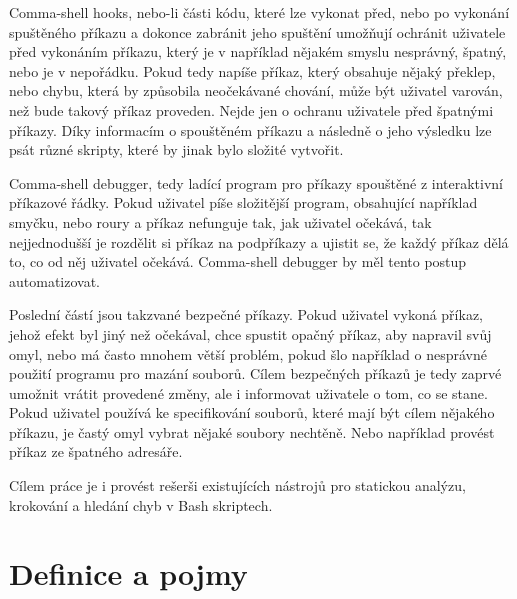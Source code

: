 \documentclass[thesis=M,czech]{FITthesis}[2012/06/26]
\begin{document}
\begin{introduction}
Comma-shell hooks, nebo-li části kódu, které lze vykonat před, nebo po vykonání spuštěného příkazu a dokonce zabránit jeho spuštění umožňují ochránit uživatele před vykonáním příkazu, který je v například nějakém smyslu nesprávný, špatný, nebo je v nepořádku. Pokud tedy napíše příkaz, který obsahuje nějaký překlep, nebo chybu, která by způsobila neočekávané chování, může být uživatel varován, než bude takový příkaz proveden. Nejde jen o ochranu uživatele před špatnými příkazy. Díky informacím o spouštěném příkazu a následně o jeho výsledku lze psát různé skripty, které by jinak bylo složité vytvořit.

Comma-shell debugger, tedy ladící program pro příkazy spouštěné z interaktivní příkazové řádky. Pokud uživatel píše složitější program, obsahující například smyčku, nebo roury a příkaz nefunguje tak, jak uživatel očekává, tak nejjednodušší je rozdělit si příkaz na podpříkazy a ujistit se, že každý příkaz dělá to, co od něj uživatel očekává. Comma-shell debugger by měl tento postup automatizovat.

Poslední částí jsou takzvané bezpečné příkazy. Pokud uživatel vykoná příkaz, jehož efekt byl jiný než očekával, chce spustit opačný příkaz, aby napravil svůj omyl, nebo má často mnohem větší problém, pokud šlo například o nesprávné použití programu pro mazání souborů. Cílem bezpečných příkazů je tedy zaprvé umožnit vrátit provedené změny, ale i informovat uživatele o tom, co se stane. Pokud uživatel používá ke specifikování souborů, které mají být cílem nějakého příkazu, je častý omyl vybrat nějaké soubory nechtěně. Nebo například provést příkaz ze špatného adresáře.

Cílem práce je i provést rešerši existujících nástrojů pro statickou analýzu, krokování a hledání chyb v Bash skriptech.




\end{introduction}

\chapter{Definice a pojmy}
\end{document}
